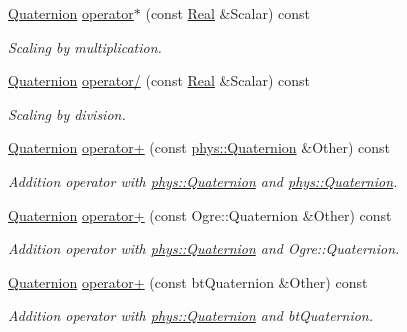 \begin{DoxyCompactItemize}
\hyperlink{classphys_1_1Quaternion}{Quaternion} \hyperlink{classphys_1_1Quaternion_a8a67c3e05a56a38407f899020c61631d}{operator$\ast$} (const \hyperlink{namespacephys_af7eb897198d265b8e868f45240230d5f}{Real} \&Scalar) const 
\begin{DoxyCompactList}\small\item\em Scaling by multiplication. \item\end{DoxyCompactList}\item 
\hyperlink{classphys_1_1Quaternion}{Quaternion} \hyperlink{classphys_1_1Quaternion_a9b9492e5a14178aedc784e93b0153364}{operator/} (const \hyperlink{namespacephys_af7eb897198d265b8e868f45240230d5f}{Real} \&Scalar) const 
\begin{DoxyCompactList}\small\item\em Scaling by division. \item\end{DoxyCompactList}\item 
\hyperlink{classphys_1_1Quaternion}{Quaternion} \hyperlink{classphys_1_1Quaternion_af3f9a9b5835400dc5b83ba06bf9845b0}{operator+} (const \hyperlink{classphys_1_1Quaternion}{phys::Quaternion} \&Other) const 
\begin{DoxyCompactList}\small\item\em Addition operator with \hyperlink{classphys_1_1Quaternion}{phys::Quaternion} and \hyperlink{classphys_1_1Quaternion}{phys::Quaternion}. \item\end{DoxyCompactList}\item 
\hyperlink{classphys_1_1Quaternion}{Quaternion} \hyperlink{classphys_1_1Quaternion_a71fcb37dae7602349e856b202ca00e89}{operator+} (const Ogre::Quaternion \&Other) const 
\begin{DoxyCompactList}\small\item\em Addition operator with \hyperlink{classphys_1_1Quaternion}{phys::Quaternion} and Ogre::Quaternion. \item\end{DoxyCompactList}\item 
\hyperlink{classphys_1_1Quaternion}{Quaternion} \hyperlink{classphys_1_1Quaternion_a3dc35eeb41c43ce79fdf2fc64fc15532}{operator+} (const btQuaternion \&Other) const 
\begin{DoxyCompactList}\small\item\em Addition operator with \hyperlink{classphys_1_1Quaternion}{phys::Quaternion} and btQuaternion. \item\end{DoxyCompactList}\item 

\end{DoxyCompactItemize}
